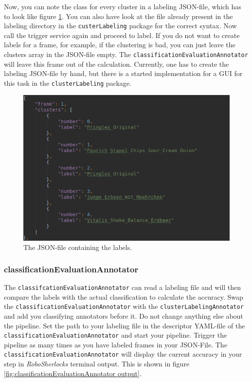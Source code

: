 \documentclass[main.tex]{subfiles}
\begin{document}
\newpage


Now, you can note the class for every cluster in a labeling JSON-file, which has to look like figure \ref{fig:labeling file}. You can also have look at the file already present in the labeling directory in the \texttt{custerLabeling} package for the correct syntax. Now call the trigger service again and proceed to label. If you do not want to create labels for a frame, for example, if the clustering is bad, you can just leave the clusters array in the JSON-file empty. The \texttt{classificationEvaluationAnnotator} will leave this frame out of the calculation. Currently, one has to create the labeling JSON-file by hand, but there is a started implementation for a GUI for this task in the \texttt{clusterLabeling} package.

\begin{figure}
  \includegraphics[width=\linewidth]{pictures/perception/labeling_file.png}
  \caption{The JSON-file containing the labels.}
  \label{fig:labeling file}
\end{figure}


\subsubsection{classificationEvaluationAnnotator}
The \texttt{classifcationEvaluationAnnotator} can read a labeling file and will then compare the labels with the actual classification to calculate the accuracy. Swap the \texttt{classificationEvaluationAnnotator} with the \texttt{clusterLabelingAnnotator} and add you classifying annotators before it. Do not change anything else about the pipeline. Set the path to your labeling file in the descriptor YAML-file of the \texttt{classificationEvaluationAnnotator} and start your pipeline. Trigger the pipeline as many times as you have labeled frames in your JSON-File. The \texttt{classificationEvaluationAnnotator} will display the current accuracy in your step in \textit{RoboSherlocks} terminal output. This is shown in figure \ref{fig:classificationEvaluationAnnotator output}.
\end{document}
